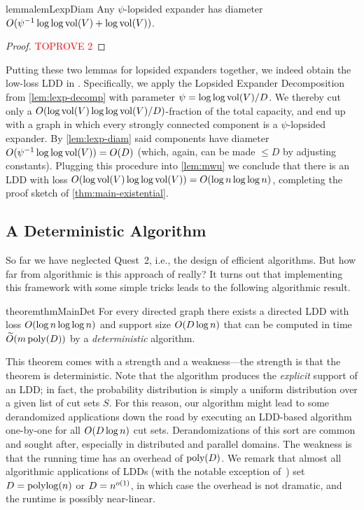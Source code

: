 \begin{restatable}{lemma}{lemLexpDiam} \label{lem:lexp-diam}
	Any $\psi$-lopsided expander has diameter $O(\psi^{-1} \log \log \operatorname{vol}(V) + \log\operatorname{vol}(V))$.
\end{restatable}

\begin{proof}\textcolor{red}{TOPROVE 2}\end{proof}

Putting these two lemmas for lopsided expanders together, we indeed obtain the low-loss LDD in . Specifically, we apply the Lopsided Expander Decomposition from \cref{lem:lexp-decomp} with parameter $\psi = \log\log \operatorname{vol}(V) / D$. We thereby cut only a $O(\log \operatorname{vol}(V) \log\log \operatorname{vol}(V) / D)$-fraction of the total capacity, and end up with a graph in which every strongly connected component is a $\psi$-lopsided expander. By \cref{lem:lexp-diam} said components have diameter $O(\psi^{-1} \log\log \operatorname{vol}(V)) = O(D)$ (which, again, can be made $\leq D$ by adjusting constants). Plugging this procedure into \cref{lem:mwu} we conclude that there is an LDD with loss $O(\log \operatorname{vol}(V) \log\log \operatorname{vol}(V)) = O(\log n \log\log n)$, completing the proof sketch of \cref{thm:main-existential}.

\subsection{A Deterministic Algorithm} \label{sec:overviewDet}
So far we have neglected Quest~2, i.e., the design of efficient algorithms. But how far from algorithmic is this approach of  really? It turns out that implementing this framework with some simple tricks leads to the following algorithmic result.

\begin{restatable}{theorem}{thmMainDet} \label{thm:main-det}
	For every directed graph there exists a directed LDD with loss $O(\log n \log\log n)$ and support size $O(D \log n)$ that can be computed in time $\widetilde{O}(m \operatorname{\text{{\rm poly}}}(D))$ by a \emph{deterministic} algorithm.
\end{restatable}

This theorem comes with a strength and a weakness---the strength is that the theorem is deterministic. Note that the algorithm produces the \emph{explicit} support of an LDD; in fact, the probability distribution is simply a uniform distribution over a given list of cut sets $S$. For this reason, our algorithm might lead to some derandomized applications down the road by executing an LDD-based algorithm one-by-one for all $O(D \log n)$ cut sets. Derandomizations of this sort are common and sought after, especially in distributed and parallel domains. The weakness is that the running time has an overhead of $\operatorname{\text{{\rm poly}}}(D)$. We remark that almost all algorithmic applications of LDDs (with the notable exception of~\cite{BernsteinNW22}) set $D = \operatorname{polylog}(n)$ or $D = n^{o(1)}$, in which case the overhead is not dramatic, and the runtime is possibly near-linear.

